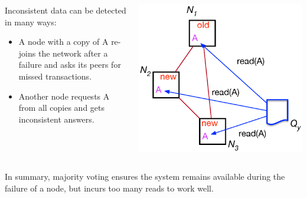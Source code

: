 \begin{frame}

\begin{columns}[onlytextwidth]
\begin{column}{0.55\textwidth}
Inconsistent data can be detected in many ways:
\begin{itemize}[-,noitemsep,topsep=-5pt]
 \item A node with a copy of \alert{A} re-joins the network after a failure and asks its peers for missed transactions.
 \item Another node requests \alert{A} from all copies and gets inconsistent answers.
\end{itemize}
\end{column}
\begin{column}{0.4\textwidth}
\includegraphics[width=1.1\textwidth]{figures/majority_read_all.eps}
\end{column}
\end{columns}

In summary, majority voting ensures the system remains available during the failure of a node, but incurs too many reads to work well.

\end{frame}

%
%

